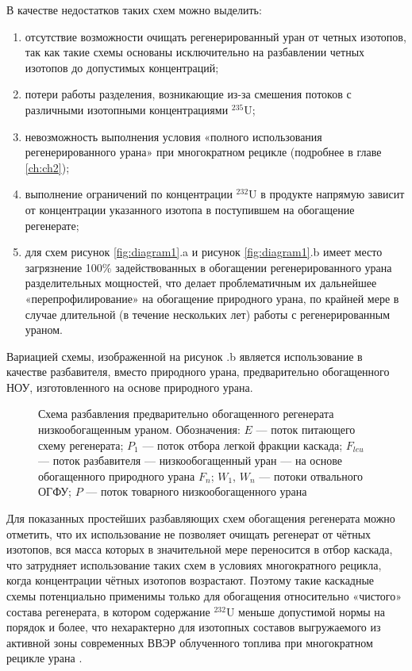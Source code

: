 В качестве недостатков таких схем можно выделить:
\begin{enumerate}
  \item отсутствие возможности очищать регенерированный уран от четных изотопов, так как такие схемы основаны исключительно на разбавлении четных изотопов до допустимых концентраций;
  \item потери работы разделения, возникающие из-за смешения потоков с различными изотопными концентрациями $^{235}$U;
  \item невозможность выполнения условия «полного использования регенерированного урана» при многократном рецикле \cite{smirnovApplyingEnrichmentCapacities2018} (подробнее в главе \ref{ch:ch2});
  \item выполнение ограничений по концентрации $^{232}$U в продукте напрямую зависит от концентрации указанного изотопа в поступившем на обогащение регенерате;
  \item для схем рисунок \ref{fig:diagram1}.a и рисунок \ref{fig:diagram1}.b имеет место загрязнение 100\% задействованных в обогащении регенерированного урана разделительных мощностей, что делает проблематичным их дальнейшее «перепрофилирование» на обогащение природного урана, по крайней мере в случае длительной (в течение нескольких лет) работы с регенерированным ураном.
\end{enumerate}

Вариацией схемы, изображенной на рисунок \label{fig:diagram1}.b является использование в качестве разбавителя, вместо природного урана, предварительно обогащенного НОУ, изготовленного на основе природного урана. 

\begin{figure}[ht]
  \caption{Схема разбавления предварительно обогащенного регенерата низкообогащенным ураном. Обозначения: $E$ --- поток питающего схему регенерата; $P_1$ --- поток отбора легкой фракции каскада; $F_{leu}$ --- поток разбавителя --- низкообогащенный уран --- на основе обогащенного природного урана $F_n$; $W_1$, $W_n$ --- потоки отвального ОГФУ; $P$ --- поток товарного низкообогащенного урана}\label{ord_leu}
\end{figure}

Для показанных простейших разбавляющих схем обогащения регенерата можно отметить, что их использование не позволяет очищать регенерат от чётных изотопов, вся масса которых в значительной мере переносится в отбор каскада, что затрудняет использование таких схем в условиях многократного рецикла, когда концентрации чётных изотопов возрастают. Поэтому такие каскадные схемы потенциально применимы только для обогащения относительно «чистого» состава регенерата, в котором содержание $^{232}$U меньше допустимой нормы на порядок и более, что нехарактерно для изотопных составов выгружаемого из активной зоны современных ВВЭР облученного топлива при многократном рецикле урана \cite{bormanTehnikoekonomicheskiyAnalizVozmozhnyh2012}. 

